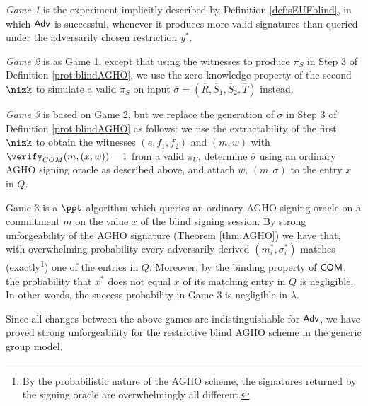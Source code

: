 \begin{description}
\item
\emph{Game 1} is the experiment implicitly described by Definition \ref{def:sEUFblind}, 
in which $\mathsf{Adv}$ is successful, whenever it produces more valid signatures than queried under the adversarily chosen restriction $y^*$.
 
\item
\emph{Game 2} is as Game 1, except that using the witnesses to produce $\pi_S$ in Step 3 of Definition \ref{prot:blindAGHO}, we use the zero-knowledge property of the second $\nizk$ to simulate a valid $\pi_S$ on input $\overline\sigma= (\overline R, \overline S_1, \overline S_2, \overline T)$ instead. 

\item
\emph{Game 3} is based on Game 2, but 
we replace the generation of $\overline\sigma$ in Step 3 of Definition \ref{prot:blindAGHO} as follows:
we use the extractability of the first $\nizk$  to obtain the witnesses $(e,f_1,f_2)$ and $(m,w)$ with $\verify_{COM}(m,(x,w))=1$ from a valid $\pi_U$, determine $\overline\sigma$ using an ordinary AGHO signing oracle as described above, and attach $w$, $(m,\sigma)$ to the entry $x$ in $Q$.
\end{description}

Game 3 is a $\ppt$ algorithm which queries an ordinary AGHO signing oracle on a commitment $m$ on the value $x$ of the blind signing session.
By strong unforgeability of the AGHO signature (Theorem \ref{thm:AGHO}) we have that, with overwhelming probability every adversarily derived $(m_i^*,\sigma_i^*)$ matches (exactly\footnote{By the probabilistic nature of the AGHO scheme, the signatures returned by the signing oracle are overwhelmingly all different.}) one of the entries in $Q$.
Moreover, by the binding property of $\operatorname{\mathsf{COM}}$, the probability that $x^*$ does not equal $x$ of its matching entry in $Q$ is negligible.
In other words, the success probability in Game 3 is negligible in $\lambda$.

Since all  changes between the above games are indistinguishable for $\mathsf{Adv}$, we have proved strong unforgeability for the restrictive blind AGHO scheme in the generic group model.


